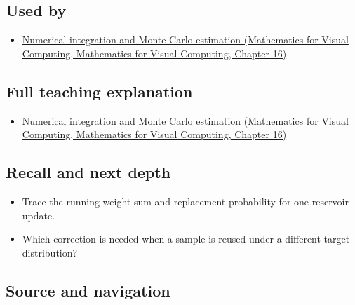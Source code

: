 \subsection{Used by}\label{appendix-68be451b78b1-used-by}

\begin{itemize}
\tightlist
\item
  \href{../02-Mathematics-for-Visual-Computing/main.pdf\#nameddest=03-visual-computing-i-ch012-numerical-integration-and-monte-carlo-estimation}{Numerical integration and Monte Carlo estimation (Mathematics for Visual Computing, Mathematics for Visual Computing, Chapter 16)}
\end{itemize}

\subsection{Full teaching explanation}\label{appendix-68be451b78b1-full-teaching-explanation}

\begin{itemize}
\tightlist
\item
  \href{../02-Mathematics-for-Visual-Computing/main.pdf\#nameddest=03-visual-computing-i-ch012-numerical-integration-and-monte-carlo-estimation}{Numerical integration and Monte Carlo estimation (Mathematics for Visual Computing, Mathematics for Visual Computing, Chapter 16)}
\end{itemize}

\subsection{Recall and next depth}\label{appendix-68be451b78b1-recall-and-next-depth}

\begin{itemize}
\tightlist
\item
  Trace the running weight sum and replacement probability for one reservoir update.
\item
  Which correction is needed when a sample is reused under a different target distribution?
\end{itemize}

\subsection{Source and navigation}\label{appendix-68be451b78b1-source-and-navigation}

